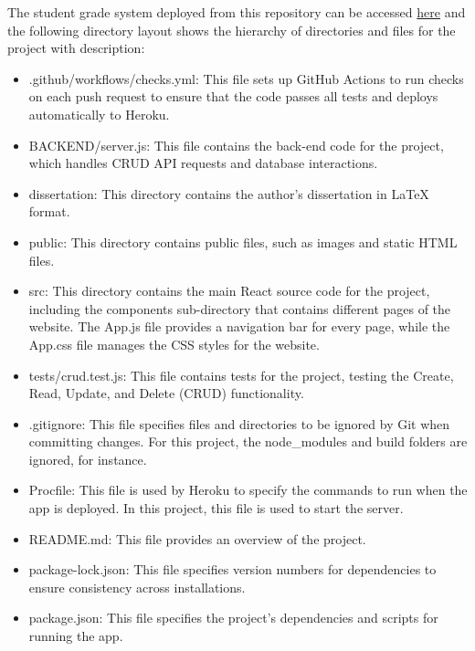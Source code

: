 The student grade system deployed from this repository can be accessed \href{https://student-grade-system.herokuapp.com/}{here} and the following directory layout shows the hierarchy of directories and files for the project with description:
\newline
{}

\begin{itemize}
\item .github/workflows/checks.yml: This file sets up GitHub Actions to run checks on each push request to ensure that the code passes all tests and deploys automatically to Heroku.
\item BACKEND/server.js: This file contains the back-end code for the project, which handles CRUD API requests and database interactions.
\item dissertation: This directory contains the author's dissertation in LaTeX format.
\item public: This directory contains public files, such as images and static HTML files.
\item src: This directory contains the main React source code for the project, including the components sub-directory that contains different pages of the website. The App.js file provides a navigation bar for every page, while the App.css file manages the CSS styles for the website.
\item tests/crud.test.js: This file contains tests for the project, testing the Create, Read, Update, and Delete (CRUD) functionality.
\item .gitignore: This file specifies files and directories to be ignored by Git when committing changes. For this project, the node\_modules and build folders are ignored, for instance.
\item Procfile: This file is used by Heroku to specify the commands to run when the app is deployed. In this project, this file is used to start the server.
\item README.md: This file provides an overview of the project.
\item package-lock.json: This file specifies version numbers for dependencies to ensure consistency across installations.
\item package.json: This file specifies the project's dependencies and scripts for running the app.
\end{itemize}